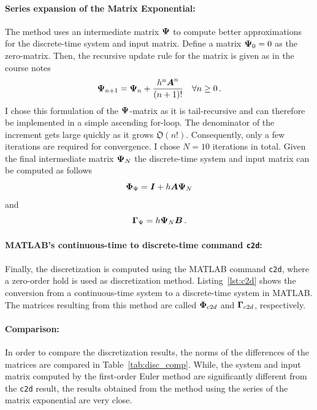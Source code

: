 \paragraph{Series expansion of the Matrix Exponential: } The method uses an intermediate matrix $\boldsymbol{\Psi}$ to compute better approximations for the discrete-time system and input matrix.
Define a matrix $\boldsymbol{\Psi}_0 = 0$ as the zero-matrix.
Then, the recursive update rule for the matrix is given as in the course notes
\begin{equation}
	\boldsymbol{\Psi}_{n+1} = \boldsymbol{\Psi}_n + \frac{h^n \boldsymbol{A}^n}{(n+1)!} \quad \forall n\ge0\, .
\end{equation}
I chose this formulation of the $\boldsymbol{\Psi}$-matrix as it is tail-recursive and can therefore be implemented in a simple ascending for-loop.
The denominator of the increment gets large quickly as it grows $\mathfrak{O}(n!)$.
Consequently, only a few iterations are required for convergence. 
I chose $N=10$ iterations in total.
Given the final intermediate matrix $\boldsymbol{\Psi}_N$ the discrete-time system and input matrix can be computed as follows
\begin{equation}
	\boldsymbol{\Phi}_{\Psi} = \boldsymbol{I} + h\boldsymbol{A}\boldsymbol{\Psi}_N	
\end{equation}
and
\begin{equation}
	\boldsymbol{\Gamma}_{\Psi} = h\boldsymbol{\Psi}_N \boldsymbol{B}\, .
\end{equation}

\paragraph{MATLAB's continuous-time to discrete-time command \texttt{c2d}: } Finally, the discretization is computed using the MATLAB command \texttt{c2d}, where a zero-order hold is used as discretization method.
Listing~\ref{lst:c2d} shows the conversion from a continuous-time system to a discrete-time system in MATLAB.
The matrices resulting from this method are called $\boldsymbol{\Phi}_{c2d}$ and $\boldsymbol{\Gamma}_{c2d}$, respectively.

\paragraph{Comparison: } In order to compare the discretization results, the norms of the differences of the matrices are compared in Table~\ref{tab:disc_comp}.
While, the system and input matrix computed by the first-order Euler method are significantly different from the \texttt{c2d} result, the results obtained from the method using the series of the matrix exponential are very close.

